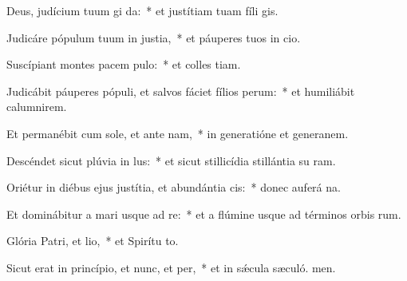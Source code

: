 \item Deus, judícium tuum gi da:~* et justítiam tuam fíli gis.
\item Judicáre pópulum tuum in justia,~* et páuperes tuos in cio.
\item Suscípiant montes pacem pulo:~* et colles tiam.
\item Judicábit páuperes pópuli, et salvos fáciet fílios perum:~* et humiliábit calumnirem.
\item Et permanébit cum sole, et ante nam,~* in generatióne et generanem.
\item Descéndet sicut plúvia in lus:~* et sicut stillicídia stillántia su ram.
\item Oriétur in diébus ejus justítia, et abundántia cis:~* donec auferá na.
\item Et dominábitur a mari usque ad re:~* et a flúmine usque ad términos orbis rum.
\item Glória Patri, et lio,~* et Spirítu to.
\item Sicut erat in princípio, et nunc, et per,~* et in sǽcula sæculó. men.

